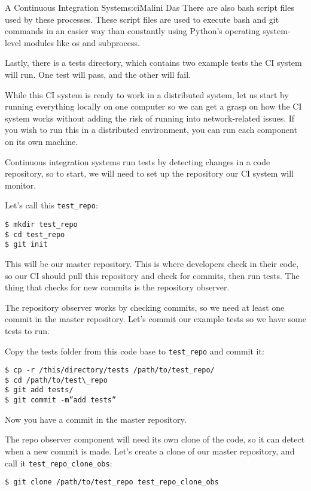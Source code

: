 \begin{aosachapter}{A Continuous Integration System}{s:ci}{Malini Das}
There are also bash script files used by these processes. These script
files are used to execute bash and git commands in an easier way than
constantly using Python's operating system-level modules like os and
subprocess.

Lastly, there is a tests directory, which contains two example tests the
CI system will run. One test will pass, and the other will fail.

\label{initial-setup}

While this CI system is ready to work in a distributed system, let us
start by running everything locally on one computer so we can get a
grasp on how the CI system works without adding the risk of running into
network-related issues. If you wish to run this in a distributed
environment, you can run each component on its own machine.

Continuous integration systems run tests by detecting changes in a code
repository, so to start, we will need to set up the repository our CI
system will monitor.

Let's call this \texttt{test\_repo}:

\begin{verbatim}
$ mkdir test_repo 
$ cd test_repo 
$ git init
\end{verbatim}

This will be our master repository. This is where developers check in
their code, so our CI should pull this repository and check for commits,
then run tests. The thing that checks for new commits is the repository
observer.

The repository observer works by checking commits, so we need at least
one commit in the master repository. Let's commit our example tests so
we have some tests to run.

Copy the tests folder from this code base to \texttt{test\_repo} and
commit it:

\begin{verbatim}
$ cp -r /this/directory/tests /path/to/test_repo/ 
$ cd /path/to/test\_repo 
$ git add tests/ 
$ git commit -m”add tests”
\end{verbatim}

Now you have a commit in the master repository.

The repo observer component will need its own clone of the code, so it
can detect when a new commit is made. Let's create a clone of our master
repository, and call it \texttt{test\_repo\_clone\_obs}:

\begin{verbatim}
$ git clone /path/to/test_repo test_repo_clone_obs
\end{verbatim}


\end{aosachapter}
